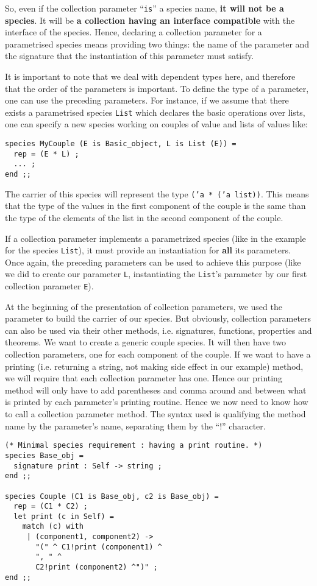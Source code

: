 So, even if the collection parameter ``{\tt is}'' a species name,
{\bf it will not be a species}. It will be {\bf a collection having an
interface compatible} with the interface of the species. Hence,
declaring a collection parameter for a parametrised species means
providing two things: the name of the parameter and the signature that
the instantiation of this parameter must satisfy.

\smallskip
It is important to note that we deal with dependent types
 here, and
therefore that the order of the parameters is important. To define the
type of a parameter, one can use the preceding parameters. For
instance, if we assume that there exists a parametrised species
{\tt List} which declares the basic operations over lists, one can
specify a new species working on couples of value and lists of values
like:
{\scriptsize
\begin{lstlisting}
species MyCouple (E is Basic_object, L is List (E)) =
  rep = (E * L) ;
  ... ;
end ;;
\end{lstlisting}
}

The carrier of this species will represent the type
{\tt ('a * ('a list))}. This means that the type of the values in the
first component of the couple is the same than the type of the
elements of the list in the second component of the couple.

\smallskip
If a collection parameter implements a parametrized species (like in
the example for the species {\tt List}), it must provide an
instantiation for {\bf all} its parameters. Once again, the preceding
parameters can be used to achieve this purpose (like we did to create
our parameter {\tt L}, instantiating the {\tt List}'s parameter by our
first collection parameter {\tt E}).

\smallskip
\label{method-qualification}
At the beginning of the presentation of collection parameters, we used
the parameter to build the carrier of our species. But obviously,
collection parameters can also be used via their other methods,
i.e. signatures, functions, properties and theorems. We want to create
a generic couple species. It will then have two collection parameters,
one for each component of the couple. If we want to have a printing
(i.e. returning a string, not making side effect in our example)
method, we will require that each collection parameter has one. Hence
our printing method will only have to add parentheses and comma
around and between what is printed by each parameter's printing
routine. Hence we now need to know how to call a collection parameter
method. The syntax used is qualifying the method name by the
parameter's name, separating them by the ``!''
character.
{\scriptsize
\begin{lstlisting}
(* Minimal species requirement : having a print routine. *)
species Base_obj =
  signature print : Self -> string ;
end ;;

species Couple (C1 is Base_obj, c2 is Base_obj) =
  rep = (C1 * C2) ;
  let print (c in Self) =
    match (c) with
     | (component1, component2) ->
       "(" ^ C1!print (component1) ^
       ", " ^
       C2!print (component2) ^")" ;
end ;;
\end{lstlisting}
}


